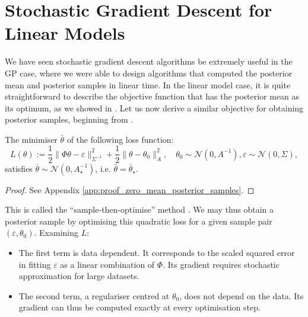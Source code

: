 \section{Stochastic Gradient Descent for Linear Models}

We have seen stochastic gradient descent algorithms be extremely useful in the GP case, where we were able to design algorithms that computed the posterior mean and posterior samples in linear time. In the linear model case, it is quite straightforward to describe the objective function that has the posterior mean as its optimum, as we showed in . Let us now derive a similar objective for obtaining posterior samples, beginning from .
\begin{selfdefinition}
    \label{def:zero_mean_posterior_samples}
    The minimiser $\bar{\theta}$ of the following loss function:
    \[
    L(\theta) := \frac{1}{2} \| \Phi \theta - \varepsilon\|^2_{\Sigma^{-1}} + \frac{1}{2} \| \theta - \theta_0 \|^2_{A} \label{eq:zero_mean_posterior_samples_loss}, \quad \theta_0 \sim \mathcal{N}(0, A^{-1}), \varepsilon \sim \mathcal{N}(0, \Sigma),
    \]
    satisfies $\bar{\theta} \sim \mathcal{N}(0, A_{\star}^{-1})$, i.e. $\bar{\theta} = \bar{\theta}_{\star}$.
\end{selfdefinition}
\begin{proof}
See Appendix \ref{app:proof_zero_mean_posterior_samples}.
\end{proof}

This is called the ``sample-then-optimise'' method \citep{Papandreou2010perturbations}. We may thus obtain a posterior sample by optimising this quadratic loss for a given sample pair $(\varepsilon, \theta_0)$. Examining $L$: 
\begin{itemize}[topsep=0pt]
  \item The first term is data dependent. It corresponds to the scaled squared error in fitting $\varepsilon$ as a linear combination of $\Phi$. Its gradient requires stochastic approximation for large datasets.
  \item The second term, a regulariser centred at $\theta_0$, does not depend on the data. Its gradient can thus be computed exactly at every optimisation step.
\end{itemize}

